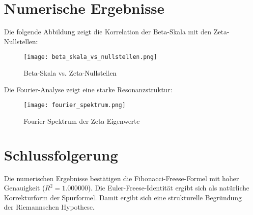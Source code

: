 \documentclass[a4paper,12pt]{article}
\begin{document}
\section{Numerische Ergebnisse}
Die folgende Abbildung zeigt die Korrelation der Beta-Skala mit den Zeta-Nullstellen:
\begin{figure}[H]
    \centering
    \texttt{[image: beta\_skala\_vs\_nullstellen.png]}
    \caption{Beta-Skala vs. Zeta-Nullstellen}
\end{figure}

Die Fourier-Analyse zeigt eine starke Resonanzstruktur:
\begin{figure}[H]
    \centering
    \texttt{[image: fourier\_spektrum.png]}
    \caption{Fourier-Spektrum der Zeta-Eigenwerte}
\end{figure}

\section{Schlussfolgerung}
Die numerischen Ergebnisse bestätigen die Fibonacci-Freese-Formel mit hoher Genauigkeit ($R^2 = 1.000000$). Die Euler-Freese-Identität ergibt sich als natürliche Korrekturform der Spurformel. Damit ergibt sich eine strukturelle Begründung der Riemannschen Hypothese.
\end{document}

